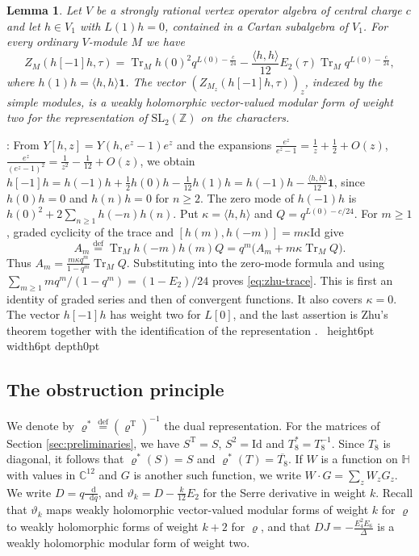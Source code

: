 \documentclass[leqno]{article}
\newcommand{\Cbb}{\ensuremath{\mathbb{C}}}
\newcommand{\Z}{\ensuremath{\mathbb{Z}}}
\newcommand{\Id}{\mathrm{Id}}
\renewcommand{\geq}{\ensuremath{\geqslant}}
\newcommand{\qed}{\hfill \vrule height6pt  width6pt depth0pt}
\newcommand{\ovl}{\overline}
\newcommand{\ov}{\overset}
\renewcommand{\d}{\mathop{}\mathopen{}\mathrm{d}}
\renewcommand{\d}{\mathop{}\mathopen{}\mathrm{d}}
\newtheorem{lemma}[thm]{Lemma}
\newenvironment{proof}[1][]{\noindent {\it Proof #1} : }{\hbox{~}\qed
\smallskip
}
\numberwithin{equation}{section}
\begin{document}
\begin{lemma}
\label{lem:zhu-trace}
Let $V$ be a strongly rational vertex operator algebra of central charge $c$ and let $h \in V_1$ with $L(1)h = 0$, contained in a Cartan subalgebra of $V_1$. For every ordinary $V$-module $M$ we have
\begin{equation}
\label{eq:zhu-trace}
Z_M(h[-1]h,\tau) = \operatorname{Tr}_M h(0)^2q^{L(0)-\frac{c}{24}}-\frac{\langle h,h\rangle}{12}E_2(\tau)\operatorname{Tr}_M q^{L(0)-\frac{c}{24}},
\end{equation}
where $h(1)h = \langle h,h\rangle\mathbf 1$. The vector $(Z_{M_z}(h[-1]h,\tau))_z$, indexed by the simple modules, is a weakly holomorphic vector-valued modular form of weight two for the representation of $\mathrm{SL}_2(\Z)$ on the characters.
\end{lemma}

\begin{proof}
From $Y[h,z] = Y(h,e^z-1)e^z$ and the expansions $\frac{e^z}{e^z-1} = \frac1z+\frac12+O(z)$, $\frac{e^z}{(e^z-1)^2} = \frac{1}{z^2}-\frac{1}{12}+O(z)$, we obtain $h[-1]h = h(-1)h+\frac12h(0)h-\frac{1}{12}h(1)h = h(-1)h-\frac{\langle h,h\rangle}{12}\mathbf 1$, since $h(0)h = 0$ and $h(n)h = 0$ for $n \geq 2$. The zero mode of $h(-1)h$ is $h(0)^2+2\sum_{n \geq 1}h(-n)h(n)$. Put $\kappa = \langle h,h\rangle$ and $Q = q^{L(0)-c/24}$. For $m \geq 1$, graded cyclicity of the trace and $[h(m),h(-m)] = m\kappa\Id$ give
\[
A_m \ov{\mathrm{def}}{=} \operatorname{Tr}_M h(-m)h(m)Q
= q^m\big(A_m+m\kappa\operatorname{Tr}_M Q\big).
\]
Thus $A_m = \frac{m\kappa q^m}{1-q^m}\operatorname{Tr}_M Q$. Substituting into the zero-mode formula and using $\sum_{m \geq 1}mq^m/(1-q^m) = (1-E_2)/24$ proves \eqref{eq:zhu-trace}. This is first an identity of graded series and then of convergent functions. It also covers $\kappa = 0$. The vector $h[-1]h$ has weight two for $L[0]$, and the last assertion is Zhu's theorem \cite{Zhu96} together with the identification of the representation \cite{Hua08}.
\end{proof}

\subsection{The obstruction principle}

We denote by $\varrho^* \ov{\mathrm{def}}{=} (\varrho^{\mathrm T})^{-1}$ the dual representation. For the matrices of Section \ref{sec:preliminaries}, we have $S^{\mathrm T} = S$, $S^2 = \Id$ and $T_8^* = T_8^{-1}$. Since $T_8$ is diagonal, it follows that $\varrho^*(S) = S$ and $\varrho^*(T) = \ovl{T_8}$. If $W$ is a function on $\mathbb H$ with values in $\Cbb^{12}$ and $G$ is another such function, we write $W \cdot G = \sum_z W_zG_z$. We write $D = q\frac{\d}{\d q}$, and $\vartheta_k = D-\frac{k}{12}E_2$ for the Serre derivative in weight $k$. Recall that $\vartheta_k$ maps weakly holomorphic vector-valued modular forms of weight $k$ for $\varrho$ to weakly holomorphic forms of weight $k+2$ for $\varrho$, and that $DJ = -\frac{E_4^2E_6}{\Delta}$ is a weakly holomorphic modular form of weight two.
\end{document}
